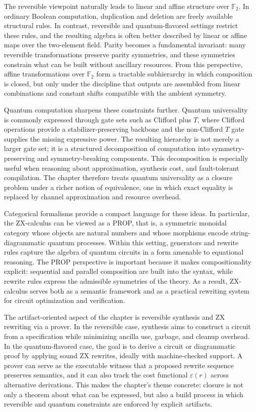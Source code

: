 \documentclass[11pt]{article}
\begin{document}
The reversible viewpoint naturally leads to linear and affine structure over \(\mathbb{F}_2\). In ordinary Boolean computation, duplication and deletion are freely available structural rules. In contrast, reversible and quantum-flavored settings restrict these rules, and the resulting algebra is often better described by linear or affine maps over the two-element field. Parity becomes a fundamental invariant: many reversible transformations preserve parity symmetries, and these symmetries constrain what can be built without ancillary resources. From this perspective, affine transformations over \(\mathbb{F}_2\) form a tractable subhierarchy in which composition is closed, but only under the discipline that outputs are assembled from linear combinations and constant shifts compatible with the ambient symmetry.

Quantum computation sharpens these constraints further. Quantum universality is commonly expressed through gate sets such as Clifford plus \(T\), where Clifford operations provide a stabilizer-preserving backbone and the non-Clifford \(T\) gate supplies the missing expressive power. The resulting hierarchy is not merely a larger gate set; it is a structured decomposition of computation into symmetry-preserving and symmetry-breaking components. This decomposition is especially useful when reasoning about approximation, synthesis cost, and fault-tolerant compilation. The chapter therefore treats quantum universality as a closure problem under a richer notion of equivalence, one in which exact equality is replaced by channel approximation and resource overhead.

Categorical formalisms provide a compact language for these ideas. In particular, the ZX-calculus can be viewed as a PROP, that is, a symmetric monoidal category whose objects are natural numbers and whose morphisms encode string-diagrammatic quantum processes. Within this setting, generators and rewrite rules capture the algebra of quantum circuits in a form amenable to equational reasoning. The PROP perspective is important because it makes compositionality explicit: sequential and parallel composition are built into the syntax, while rewrite rules express the admissible symmetries of the theory. As a result, ZX-calculus serves both as a semantic framework and as a practical rewriting system for circuit optimization and verification.

The artifact-oriented aspect of the chapter is reversible synthesis and ZX rewriting via a prover. In the reversible case, synthesis aims to construct a circuit from a specification while minimizing ancilla use, garbage, and cleanup overhead. In the quantum-flavored case, the goal is to derive a circuit or diagrammatic proof by applying sound ZX rewrites, ideally with machine-checked support. A prover can serve as the executable witness that a proposed rewrite sequence preserves semantics, and it can also track the cost functional \(\varepsilon(r)\) across alternative derivations. This makes the chapter’s theme concrete: closure is not only a theorem about what can be expressed, but also a build process in which reversible and quantum constraints are enforced by explicit artifacts.
\end{document}
